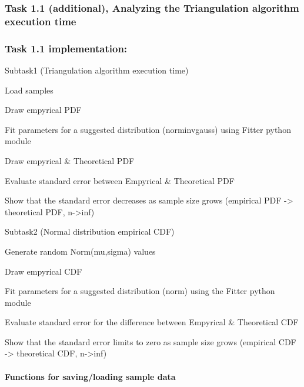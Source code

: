 \documentclass[11pt]{article}
\begin{document}
    \hypertarget{task-1.1-additional-analyzing-the-triangulation-algorithm-execution-time}{%
\subsubsection{Task 1.1 (additional), Analyzing the Triangulation
algorithm execution
time}\label{task-1.1-additional-analyzing-the-triangulation-algorithm-execution-time}}

    \hypertarget{task-1.1-implementation}{%
\subsubsection{Task 1.1 implementation:}\label{task-1.1-implementation}}

Subtask1 (Triangulation algorithm execution time)

Load samples

Draw empyrical PDF

Fit parameters for a suggested distribution (norminvgauss) using Fitter
python module

Draw empyrical \& Theoretical PDF

Evaluate standard error between Empyrical \& Theoretical PDF

Show that the standard error decreases as sample size grows (empirical
PDF -\textgreater{} theoretical PDF, n-\textgreater inf)

Subtask2 (Normal distribution empirical CDF)

Generate random Norm(mu,sigma) values

Draw empyrical CDF

Fit parameters for a suggested distribution (norm) using the Fitter
python module

Evaluate standard error for the difference between Empyrical \&
Theoretical CDF

Show that the standard error limits to zero as sample size grows
(empirical CDF -\textgreater{} theoretical CDF, n-\textgreater inf)

    \hypertarget{functions-for-savingloading-sample-data}{%
\paragraph{Functions for saving/loading sample
data}\label{functions-for-savingloading-sample-data}}
\end{document}
